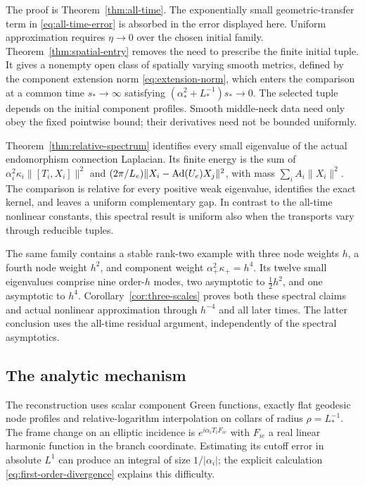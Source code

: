 The proof is Theorem~\ref{thm:all-time}. The exponentially
small geometric-transfer term in \eqref{eq:all-time-error}
is absorbed in the error displayed here. Uniform approximation
requires $\eta\to0$ over the chosen initial family.
Theorem~\ref{thm:spatial-entry} removes the need to prescribe
the finite initial tuple. It gives a nonempty open class of
spatially varying smooth metrics, defined by the component
extension norm \eqref{eq:extension-norm}, which enters the
comparison at a common time $s_*\to\infty$ satisfying
$(\alpha_*^2+L_*^{-1})s_*\to0$. The selected tuple depends
on the initial component profiles. Smooth middle-neck data
need only obey the fixed pointwise bound; their derivatives
need not be bounded uniformly.

Theorem~\ref{thm:relative-spectrum} identifies every small
eigenvalue of the actual endomorphism connection Laplacian.
Its finite energy is the sum of
$\alpha_i^2\kappa_i\|[T_i,X_i]\|^2$ and
$(2\pi/L_e)\|X_i-\operatorname{Ad}(U_e)X_j\|^2$, with mass
$\sum_i A_i\|X_i\|^2$. The comparison is relative for
every positive weak eigenvalue, identifies the exact kernel,
and leaves a uniform complementary gap. In contrast to the
all-time nonlinear constants, this spectral result is uniform
also when the transports vary through reducible tuples.

The same family contains a stable rank-two example with
three node weights $h$, a fourth node weight $h^2$, and
component weight $\alpha_+^2\kappa_+=h^4$. Its twelve
small eigenvalues comprise nine order-$h$ modes, two
asymptotic to $\tfrac12h^2$, and one asymptotic to $h^4$.
Corollary~\ref{cor:three-scales} proves both these spectral
claims and actual nonlinear approximation through $h^{-4}$
and all later times. The latter conclusion uses the all-time
residual argument, independently of the spectral asymptotics.

\subsection{The analytic mechanism}
The reconstruction uses scalar component Green functions,
exactly flat geodesic node profiles and relative-logarithm
interpolation on collars of radius $\rho=L_*^{-1}$.
The frame change on an elliptic incidence is
$e^{i\alpha_iT_iF_{ie}}$ with $F_{ie}$ a real linear
harmonic function in the branch coordinate. Estimating its
cutoff error in absolute $L^1$ can produce an integral
of size $1/|\alpha_i|$; the explicit calculation
\eqref{eq:first-order-divergence} explains this difficulty.

